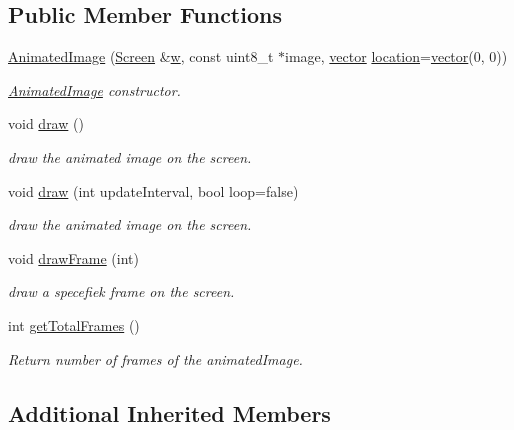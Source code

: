 \subsection*{Public Member Functions}
\begin{DoxyCompactItemize}
\item 
\hyperlink{class_animated_image_a8b076dfb51777da777b77d2c5283ff6d}{Animated\+Image} (\hyperlink{class_screen}{Screen} \&\hyperlink{class_graphics_a7a73ddd0d3cf1b67fc54f303be017c3b}{w}, const uint8\+\_\+t $\ast$image, \hyperlink{classvector}{vector} \hyperlink{class_graphics_a88c2112c7a3db3ee56f4c7fe2cac6055}{location}=\hyperlink{classvector}{vector}(0, 0))
\begin{DoxyCompactList}\small\item\em \hyperlink{class_animated_image}{Animated\+Image} constructor\textquotesingle{}. \end{DoxyCompactList}\item 
void \hyperlink{class_animated_image_ab71f472b7a737d142fb6bf838dfc9818}{draw} ()
\begin{DoxyCompactList}\small\item\em draw the animated image on the screen. \end{DoxyCompactList}\item 
void \hyperlink{class_animated_image_a70cc2439dedf9e5fc366dd3a1534c167}{draw} (int update\+Interval, bool loop=false)
\begin{DoxyCompactList}\small\item\em draw the animated image on the screen. \end{DoxyCompactList}\item 
void \hyperlink{class_animated_image_a4f9a9236d7e2cec0b8b140743ac8340e}{draw\+Frame} (int)
\begin{DoxyCompactList}\small\item\em draw a specefiek frame on the screen. \end{DoxyCompactList}\item 
int \hyperlink{class_animated_image_af398536b19d4bdeefebfed02c77f47b3}{get\+Total\+Frames} ()
\begin{DoxyCompactList}\small\item\em Return number of frames of the animated\+Image. \end{DoxyCompactList}\end{DoxyCompactItemize}
\subsection*{Additional Inherited Members}


